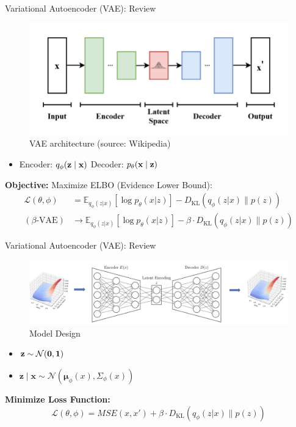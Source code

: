 \documentclass{beamer}
\begin{document}
\begin{frame}{Variational Autoencoder (VAE): Review}
    \begin{figure}
    \centering
    \includegraphics[width=0.6\linewidth]{docs/proposal/img/vaewiki.png}
    \caption{VAE architecture (source: Wikipedia)}
    \label{fig:vaewiki}
\end{figure}
\begin{itemize}
    \item Encoder: $q_\phi(\bf{z}\mid \bf{x})$ \quad Decoder: $p_\theta(\bf{x}\mid \bf{z})$

\end{itemize}
\textbf{Objective:} Maximize ELBO (Evidence Lower Bound):
\begin{align*}
\mathcal{L}(\theta, \phi) &= \mathbb{E}_{q_\phi(z|x)}[\log p_\theta(x|z)] - D_{\text{KL}}(q_\phi(z|x) \parallel p(z))\\
(\beta\text{-VAE})&\rightarrow \mathbb{E}_{q_\phi(z|x)}[\log p_\theta(x|z)] - \beta \cdot D_{\text{KL}}(q_\phi(z|x) \parallel p(z))
\end{align*}
\end{frame}


\begin{frame}{Variational Autoencoder (VAE): Review}

\begin{figure}
    \centering
    \includegraphics[width=0.85\linewidth]{docs/slides/img/model_design_full.png}
    \caption{Model Design}
\end{figure}

\begin{itemize}
    \item $\bf{z} \sim \mathcal{N}(0,\bf{1})$
    \item $\mathbf{z}\mid \mathbf{x}\sim \mathcal{N}(\mathbf{\mu}_\phi(x), \Sigma_\phi(x))$
\end{itemize}
\textbf{Minimize Loss Function:}
$$\mathcal{L}(\theta, \phi) = MSE(x, x') + \beta \cdot D_{\text{KL}}(q_\phi(z|x) \parallel p(z))$$
\end{frame}
\end{document}
